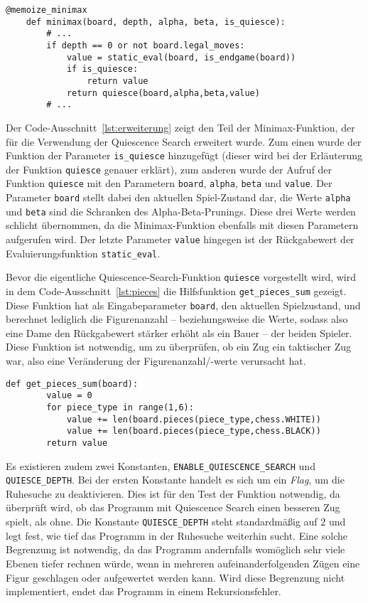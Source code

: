 \begin{lstlisting}[caption=Erweiterung der Funktion des Minimax-Algorithmus für die Verwendung von Quiescence Search, label=lst:erweiterung]
	@memoize_minimax
	def minimax(board, depth, alpha, beta, is_quiesce):
		# ...
		if depth == 0 or not board.legal_moves:
			value = static_eval(board, is_endgame(board))
			if is_quiesce:
				return value
			return quiesce(board,alpha,beta,value)
		# ...
\end{lstlisting}

Der Code-Ausschnitt~\ref{lst:erweiterung} zeigt den Teil der Minimax-Funktion, der für die Verwendung der Quiescence Search erweitert wurde. Zum einen wurde der Funktion der Parameter \texttt{is\_quiesce} hinzugefügt (dieser wird bei der Erläuterung der Funktion \texttt{quiesce} genauer erklärt), zum anderen wurde der Aufruf der Funktion \texttt{quiesce} mit den Parametern \texttt{board}, \texttt{alpha}, \texttt{beta} und \texttt{value}. Der Parameter \texttt{board} stellt dabei den aktuellen Spiel-Zustand dar, die Werte \texttt{alpha} und \texttt{beta} sind die Schranken des Alpha-Beta-Prunings. Diese drei Werte werden schlicht übernommen, da die Minimax-Funktion ebenfalls mit diesen Parametern aufgerufen wird. Der letzte Parameter \texttt{value} hingegen ist der Rückgabewert der Evaluierungsfunktion \texttt{static\_eval}.

Bevor die eigentliche Quiescence-Search-Funktion \texttt{quiesce} vorgestellt wird, wird in dem Code-Ausschnitt~\ref{lst:pieces} die Hilfsfunktion \texttt{get\_pieces\_sum} gezeigt. Diese Funktion hat als Eingabeparameter \texttt{board}, den aktuellen Spielzustand, und berechnet lediglich die Figurenanzahl -- beziehungsweise die Werte, sodass also eine Dame den Rückgabewert stärker erhöht als ein Bauer -- der beiden Spieler. Diese Funktion ist notwendig, um zu überprüfen, ob ein Zug ein taktischer Zug war, also eine Veränderung der Figurenanzahl/-werte verursacht hat.

\begin{lstlisting}[caption=Hilfsfunktion für die Differenzierung taktischer Züge, label=lst:pieces]
	def get_pieces_sum(board):
    	value = 0
    	for piece_type in range(1,6):
        	value += len(board.pieces(piece_type,chess.WHITE))
        	value += len(board.pieces(piece_type,chess.BLACK))
    	return value
\end{lstlisting}

Es existieren zudem zwei Konstanten, \texttt{ENABLE\_QUIESCENCE\_SEARCH} und \texttt{QUIESCE\_DEPTH}. Bei der ersten Konstante handelt es sich um ein \textit{Flag}, um die Ruhesuche zu deaktivieren. Dies ist für den Test der Funktion notwendig, da überprüft wird, ob das Programm mit Quiescence Search einen besseren Zug spielt, als ohne. Die Konstante \texttt{QUIESCE\_DEPTH} steht standardmäßig auf $2$ und legt fest, wie tief das Programm in der Ruhesuche weiterhin sucht. Eine solche Begrenzung ist notwendig, da das Programm andernfalls womöglich sehr viele Ebenen tiefer rechnen würde, wenn in mehreren aufeinanderfolgenden Zügen eine Figur geschlagen oder aufgewertet werden kann. Wird diese Begrenzung nicht implementiert, endet das Programm in einem Rekursionsfehler.

